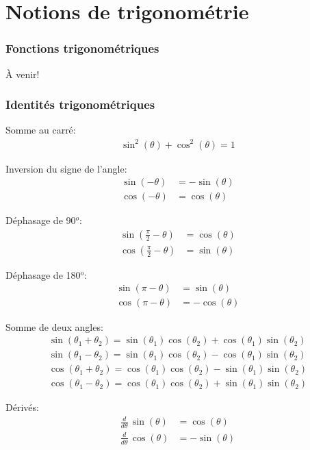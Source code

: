 \chapter{Notions de trigonométrie}


\subsection{Fonctions trigonométriques}
À venir!



\subsection{Identités trigonométriques}


Somme au carré:
\begin{align}
\sin^2(\theta) + \cos^2(\theta) = 1
\end{align}

Inversion du signe de l'angle:
\begin{align}
\sin\left(- \theta \right) &= - \sin\left( \theta \right) \\
\cos\left(- \theta \right) &=   \cos\left( \theta \right) %
\end{align}

Déphasage de 90$^o$:
\begin{align}
\sin\left(\frac{\pi}{2} - \theta \right) &= \cos(\theta) \\
\cos\left(\frac{\pi}{2} - \theta \right) &= \sin(\theta) 
\end{align}

Déphasage de 180$^o$:
\begin{align}
\sin\left(\pi - \theta \right) &= \sin(\theta) \\
\cos\left(\pi - \theta \right) &= -\cos(\theta) 
\end{align}

Somme de deux angles:
\begin{align}
\sin\left(\theta_1 + \theta_2 \right) = \sin( \theta_1 ) \cos( \theta_2 ) + \cos( \theta_1 ) \sin( \theta_2 )
\\
\sin\left(\theta_1 - \theta_2 \right) = \sin( \theta_1 ) \cos( \theta_2 ) - \cos( \theta_1 ) \sin( \theta_2 )
\\
\cos\left(\theta_1 + \theta_2 \right) = \cos( \theta_1 ) \cos( \theta_2 ) - \sin( \theta_1 ) \sin( \theta_2 )
\\
\cos\left(\theta_1 - \theta_2 \right) = \cos( \theta_1 ) \cos( \theta_2 ) + \sin( \theta_1 ) \sin( \theta_2 ) 
\end{align}

Dérivés:
\begin{align}
\frac{d}{d\theta} \, \sin\left(\theta \right) &= \cos(\theta) \\
\frac{d}{d\theta} \, \cos\left(\theta \right) &= -\sin(\theta) 
\end{align}

